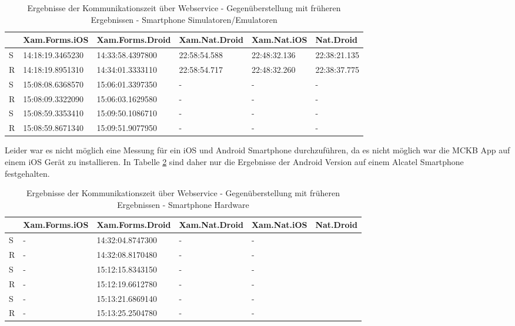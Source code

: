 	\begin{table}[h!]
		\centering
		\begin{tabular}{l|l|l|l|l|l|}
			\cline{2-6}
			                        & Xam.Forms.iOS    & Xam.Forms.Droid  & Xam.Nat.Droid& Xam.Nat.iOS  & Nat.Droid    \\ \hline
			\multicolumn{1}{|l|}{S} & 14:18:19.3465230 & 14:33:58.4397800 & 22:58:54.588 & 22:48:32.136 & 22:38:21.135 \\ \hline
			\multicolumn{1}{|l|}{R} & 14:18:19.8951310 & 14:34:01.3333110 & 22:58:54.717 & 22:48:32.260 & 22:38:37.775 \\ \hline
			\multicolumn{1}{|l|}{S} & 15:08:08.6368570 & 15:06:01.3397350 & - & - & - \\ \hline
			\multicolumn{1}{|l|}{R} & 15:08:09.3322090 & 15:06:03.1629580 & - & - & - \\ \hline
			\multicolumn{1}{|l|}{S} & 15:08:59.3353410 & 15:09:50.1086710 & - & - & - \\ \hline
			\multicolumn{1}{|l|}{R} & 15:08:59.8671340 & 15:09:51.9077950 & - & - & - \\ \hline
		\end{tabular}
		\label{tab:clsvcom}
		\caption{Ergebnisse der Kommunikationszeit über Webservice - Gegenüberstellung mit früheren Ergebnissen\cite{Maximilian2017} - Smartphone Simulatoren/Emulatoren}
	\end{table}
	
	
	\newpage
	Leider war es nicht möglich eine Messung für ein iOS und Android Smartphone durchzuführen, da es nicht möglich war die MCKB App auf einem iOS Gerät zu installieren. In Tabelle \ref{tab:clsvcomhard} sind daher nur die Ergebnisse der Android Version auf einem Alcatel Smartphone festgehalten.

	\begin{table}[h!]
		\centering
		\begin{tabular}{l|l|l|l|l|l|}
			\cline{2-6}
			                        & Xam.Forms.iOS    & Xam.Forms.Droid  & Xam.Nat.Droid& Xam.Nat.iOS  & Nat.Droid    \\ \hline
			\multicolumn{1}{|l|}{S} & 	  -			 & 14:32:04.8747300 & 		-	   & 	  -		  &  \\ \hline
			\multicolumn{1}{|l|}{R} & 	  -			 & 14:32:08.8170480 & 		-	   & 	  -		  &  \\ \hline
			\multicolumn{1}{|l|}{S} & 	  -			 & 15:12:15.8343150 & 		-	   & 	  -		  &  \\ \hline
			\multicolumn{1}{|l|}{R} & 	  -			 & 15:12:19.6612780 & 		-	   & 	  -		  &  \\ \hline
			\multicolumn{1}{|l|}{S} & 	  -			 & 15:13:21.6869140 & 		-	   & 	  -		  &  \\ \hline
			\multicolumn{1}{|l|}{R} & 	  -			 & 15:13:25.2504780 & 		-	   & 	  -		  &  \\ \hline
		\end{tabular}
		\label{tab:clsvcomhard}
		\caption{Ergebnisse der Kommunikationszeit über Webservice - Gegenüberstellung mit früheren Ergebnissen\cite{Maximilian2017} - Smartphone Hardware}
	\end{table}

